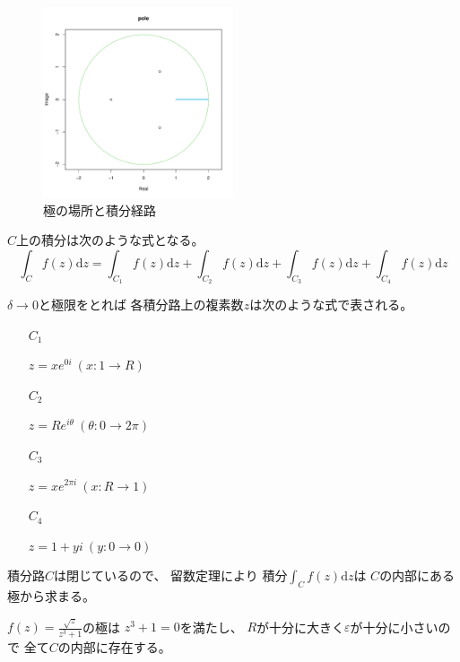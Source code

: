 \documentclass[12pt,b5paper]{ltjsarticle}
\begin{document}
\begin{figure}
\label{fig:hoge}
\centerline{\includegraphics[width=0.5\textwidth]{pole_plot_R.pdf}}
\caption{極の場所と積分経路}
\end{figure}






$C$上の積分は次のような式となる。
\begin{equation}
 \int_{C} f(z)\mathrm{d}z
  =
 \int_{C_1} f(z)\mathrm{d}z
 +
 \int_{C_2} f(z)\mathrm{d}z
 +
 \int_{C_3} f(z)\mathrm{d}z
 +
 \int_{C_4} f(z)\mathrm{d}z
\end{equation}


$\delta \to 0$と極限をとれば
各積分路上の複素数$z$は次のような式で表される。
\begin{enumerate}
 \item [$C_1$]

       $z=x e^{0i} \ (x:1 \to R)$

 \item [$C_2$]

       $z=Re^{i\theta} \ (\theta : 0\to 2\pi)$

 \item [$C_3$]

       $z=x e^{2\pi i} \ (x:R\to1)$

 \item [$C_4$]

       $z=1+ yi \ (y : 0 \to 0)$

\end{enumerate}


積分路$C$は閉じているので、
留数定理により
積分$\int_{C}f(z)\mathrm{d}z$は
$C$の内部にある極から求まる。

$f(z)=\frac{\sqrt{z}}{z^3+1}$の極は
$z^3+1=0$を満たし、
$R$が十分に大きく$\varepsilon$が十分に小さいので
全て$C$の内部に存在する。
\end{document}

